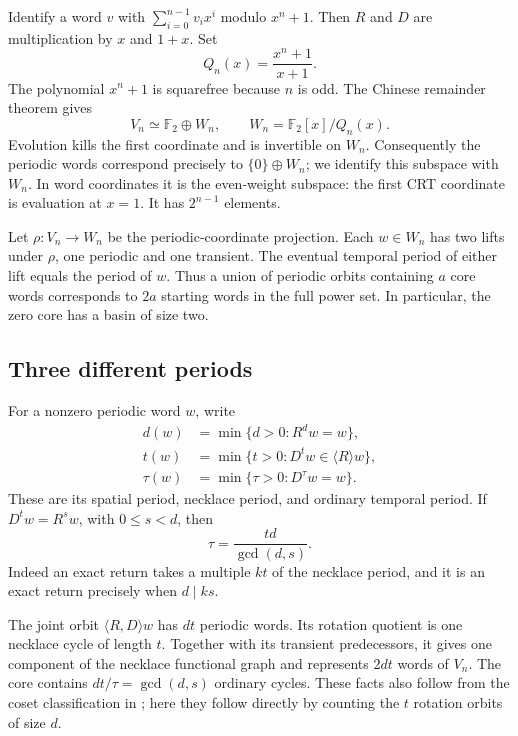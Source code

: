 \documentclass[11pt]{article}
\theoremstyle{definition}
\theoremstyle{remark}
\numberwithin{equation}{section}
\newcommand{\F}{\mathbb F_2}
\begin{document}
Identify a word $v$ with $\sum_{i=0}^{n-1}v_i x^i$ modulo $x^n+1$.
Then $R$ and $D$ are multiplication by $x$ and $1+x$. Set
\begin{equation}\label{eq:Q}
 Q_n(x)=\frac{x^n+1}{x+1}.
\end{equation}
The polynomial $x^n+1$ is squarefree because $n$ is odd. The Chinese
remainder theorem gives
\begin{equation}\label{eq:crt}
 V_n\simeq\F\oplus W_n,
 \qquad W_n=\F[x]/Q_n(x).
\end{equation}
Evolution kills the first coordinate and is invertible on $W_n$.
Consequently the periodic words correspond precisely to $\{0\}\oplus W_n$;
we identify this subspace with $W_n$. In word coordinates it is the
even-weight subspace: the first CRT coordinate is evaluation at $x=1$.
It has $2^{n-1}$ elements.

Let $\rho:V_n\to W_n$ be the periodic-coordinate projection. Each
$w\in W_n$ has two lifts under $\rho$, one periodic and one transient.
The eventual temporal period of either lift equals the period of $w$.
Thus a union of periodic orbits containing $a$ core words corresponds to
$2a$ starting words in the full power set. In particular, the zero core
has a basin of size two.

\subsection{Three different periods}

For a nonzero periodic word $w$, write
\begin{align}
 d(w)&=\min\{d>0:R^d w=w\},\label{eq:spatial}\\
 t(w)&=\min\{t>0:D^t w\in\langle R\rangle w\},\label{eq:necklace}\\
 \tau(w)&=\min\{\tau>0:D^\tau w=w\}.\label{eq:ordinary}
\end{align}
These are its spatial period, necklace period, and ordinary temporal
period. If $D^t w=R^s w$, with $0\le s<d$, then
\begin{equation}\label{eq:drift}
 \tau=\frac{td}{\gcd(d,s)}.
\end{equation}
Indeed an exact return takes a multiple $kt$ of the necklace period,
and it is an exact return precisely when $d\mid ks$.

The joint orbit $\langle R,D\rangle w$ has $dt$ periodic words.
Its rotation quotient is one necklace cycle of length $t$. Together
with its transient predecessors, it gives one component of the necklace
functional graph and represents $2dt$ words of $V_n$. The core contains
$dt/\tau=\gcd(d,s)$ ordinary cycles. These facts also follow from the
coset classification in \cite{Partition}; here they follow directly by
counting the $t$ rotation orbits of size $d$.
\end{document}
